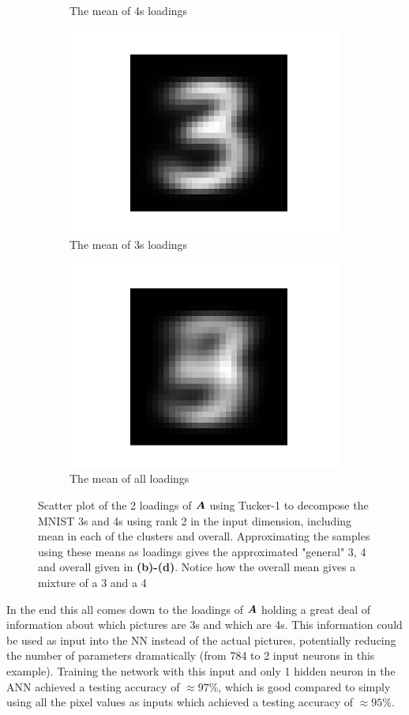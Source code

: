 \begin{figure}
\begin{subfigure}{0.3\linewidth}
        \caption{The mean of 4s loadings}
    \end{subfigure}
    \begin{subfigure}{0.3\linewidth}
    \centering
        \includegraphics[width=.5\linewidth]{Pics/06_results/general3.png}
        \caption{The mean of 3s loadings}
    \end{subfigure}
    \begin{subfigure}{0.3\linewidth}
    \centering
        \includegraphics[width=.5\linewidth]{Pics/06_results/general.png}
        \caption{The mean of all loadings}
        \label{Hej}
    \end{subfigure}
    \caption{Scatter plot of the 2 loadings of $\boldsymbol{A}$ using Tucker-1 to decompose the MNIST 3s and 4s using rank 2 in the input dimension, including mean in each of the clusters and overall. 
    Approximating the samples using these means as loadings gives the approximated "general" 3, 4 and overall given in \textbf{(b)-(d)}. Notice how the overall mean gives a mixture of a 3 and a 4}
    \label{fig:loadingsOfA}
\end{figure}

In the end this all comes down to the loadings of $\boldsymbol{A}$ holding a great deal of information about which pictures are 3s and which are 4s. This information could be used as input into the NN instead of the actual pictures, potentially reducing the number of parameters dramatically (from 784 to 2 input neurons in this example). Training the network with this input and only 1 hidden neuron in the ANN achieved a testing accuracy of $\approx 97 \%$, which is good compared to simply using all the pixel values as inputs which achieved a testing accuracy of $\approx 95\%$.

